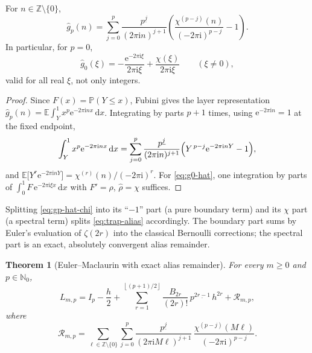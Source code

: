 \documentclass[11pt,oneside]{article}
\numberwithin{equation}{section}
\newtheorem{theorem}{Theorem}[section]
\theoremstyle{definition}
\theoremstyle{remark}
\newcommand{\N}{\mathbb N}
\newcommand{\Z}{\mathbb Z}
\newcommand{\E}{\mathbb E}
\newcommand{\Prob}{\mathbb P}
\newcommand{\dd}{\,\mathrm d}
\newcommand{\e}{\mathrm e}
\newcommand{\ii}{\mathrm i}
\newcommand{\fall}[2]{#1^{\underline{#2}}}
\newcommand{\floor}[1]{\left\lfloor #1\right\rfloor}
\newcommand{\defect}{\mathcal R}
\begin{document}
\begin{lemma}
\label{lem:gp-hat}
For $n\in\Z\setminus\{0\}$,
\begin{equation}
 \widehat g_p(n)
 =\sum_{j=0}^{p}
 \frac{\fall pj}{(2\pi\ii n)^{j+1}}
 \left(
 \frac{\chi^{(p-j)}(n)}{(-2\pi\ii)^{p-j}}-1
 \right).
 \label{eq:gp-hat-chi}
\end{equation}
In particular, for $p=0$,
\begin{equation}
 \widehat g_0(\xi)
 =-\frac{\e^{-2\pi\ii\xi}}{2\pi\ii\xi}
 +\frac{\chi(\xi)}{2\pi\ii\xi}
 \qquad(\xi\ne0),
 \label{eq:g0-hat}
\end{equation}
valid for all real $\xi$, not only integers.
\end{lemma}

\begin{proof}
Since $F(x)=\Prob(Y\le x)$, Fubini gives the layer representation
$\widehat g_p(n)=\E\int_Y^1x^{p}\e^{-2\pi\ii nx}\dd x$.  Integrating by
parts $p+1$ times, using $\e^{-2\pi\ii n}=1$ at the fixed endpoint,
\[
 \int_Y^1x^{p}\e^{-2\pi\ii nx}\dd x
 =\sum_{j=0}^{p}\frac{\fall pj}{(2\pi\ii n)^{j+1}}
 \Bigl(Y^{\,p-j}\e^{-2\pi\ii nY}-1\Bigr),
\]
and $\E\bigl[Y^{r}\e^{-2\pi\ii nY}\bigr]=\chi^{(r)}(n)/(-2\pi\ii)^{r}$.
For \eqref{eq:g0-hat}, one integration by parts of
$\int_0^1F\,\e^{-2\pi\ii\xi x}\dd x$ with $F'=\rho$,
$\widehat\rho=\chi$ suffices.
\end{proof}

Splitting \eqref{eq:gp-hat-chi} into its ``$-1$'' part (a pure
boundary term) and its $\chi$ part (a spectral term) splits
\eqref{eq:trap-alias} accordingly.  The boundary part sums by Euler's
evaluation of $\zeta(2r)$ into the classical Bernoulli corrections; the
spectral part is an exact, absolutely convergent alias remainder.

\begin{theorem}[Euler--Maclaurin with exact alias remainder]
\label{thm:EM-remainder}
For every $m\ge0$ and $p\in\N_0$,
\begin{equation}
 L_{m,p}=I_p-\frac h2+
 \sum_{r=1}^{\floor{(p+1)/2}}
 \frac{B_{2r}}{(2r)!}\,\fall p{2r-1}\,h^{2r}
 +\defect_{m,p},
 \label{eq:EM-exact-remainder}
\end{equation}
where
\begin{equation}
 \defect_{m,p}
 =\sum_{\ell\in\Z\setminus\{0\}}
 \sum_{j=0}^{p}
 \frac{\fall pj}{(2\pi\ii M\ell)^{j+1}}\,
 \frac{\chi^{(p-j)}(M\ell)}{(-2\pi\ii)^{p-j}}.
 \label{eq:R-alias}
\end{equation}
\end{theorem}
\end{document}
